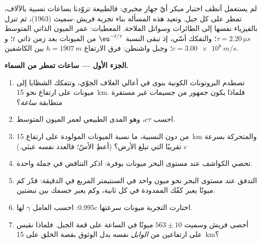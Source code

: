 \begin{problem}\label{pb:b3:relativistic-kinematics:1}
لم يستعمل أنظف اختبار مبكر  أيّ جهاز مخبري: فالطبيعة
تزوّدنا بساعات نسبية بالآلاف، تمطر على كل جبل. وتعيد هذه المسألة
بناء تجربة فريش--سميث (1963)، ثم تنزل بالفيزياء نفسها إلى
الطائرات وسواتل الملاحة. المعطيات: عمر الميون الذاتي المتوسط $\tau =
\qty{2.20}{\micro s}$؛ والتفكك أسّي، إذ تبقى النسبة
$\eu^{-t/\tau}$ من الميونات بعد زمن ذاتي $t$؛ و $c =
\qty{3.00e8}{m/s}$؛ وجبل واشنطن: فرق الارتفاع $h =
\qty{1907}{m}$ بين الكاشفين.

\medskip\noindent\textbf{الجزء الأول --- ساعات تمطر من السماء.}
\begin{enumerate}
  \item تصطدم البروتونات الكونية بنوى في أعالي الغلاف الجوّي،
        وتتفكك الشظايا إلى ميونات على ارتفاع نحو \qty{15}{km}.
        فلماذا يكون جمهور من جسيمات غير مستقرة متطابقة
        \emph{ساعة}؟
  \item احسب $c\tau$، وهو المدى الطبيعي لعمر الميون المتوسط.
  \item من دون النسبية، ما نسبة الميونات المولودة على ارتفاع
        \qty{15}{km} والمتحركة بسرعة $c$ تقريبًا التي تبلغ
        الأرض؟ (أعطِ الأسّ؛ فالعدد نفسه عبثي.)
  \item تحصي الكواشف عند مستوى البحر ميونات بوفرة: اذكر
        التناقض في جملة واحدة.
  \item التدفق عند مستوى البحر نحو ميون واحد في السنتيمتر
        المربع في الدقيقة: قدّر كم ميونًا يعبر كفّك الممدودة
        في كل ثانية، وكم يعبر جسمك بين نبضتين.
  \item اختارت التجربة ميونات سرعتها $0.995c$: احسب
        العامل $\gamma$ لها.
  \item أحصى فريش وسميث $563 \pm 10$ ميونًا في الساعة على
        قمة الجبل. فلماذا نقيس على ارتفاعين من \emph{الوابل}
        نفسه بدل الوثوق بقصة الخلق على \qty{15}{km}؟
\end{enumerate}


\end{problem}
